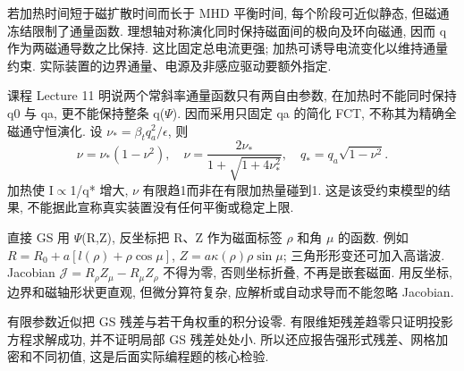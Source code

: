 \label{ch:fct}
若加热时间短于磁扩散时间而长于 MHD 平衡时间, 每个阶段可近似静态, 但磁通冻结限制了通量函数. 理想轴对称演化同时保持磁面间的极向及环向磁通, 因而 q 作为两磁通导数之比保持. 这比固定总电流更强; 加热可诱导电流变化以维持通量约束. 实际装置的边界通量、电源及非感应驱动要额外指定.

课程 Lecture 11 明说两个常斜率通量函数只有两自由参数, 在加热时不能同时保持 q0 与 qa, 更不能保持整条 q(\ensuremath{\Psi}). 因而采用只固定 qa 的简化 FCT, 不称其为精确全磁通守恒演化. 设 $\nu_*=\beta_tq_a^2/\epsilon$, 则
\begin{equation}
 \nu=\nu_*(1-\nu^2),\quad
 \nu=\frac{2\nu_*}{1+\sqrt{1+4\nu_*^2}},\quad
 q_*=q_a\sqrt{1-\nu^2}.
\end{equation}
加热使 I\ensuremath{\propto}1/q* 增大, \ensuremath{\nu} 有限趋1而非在有限加热量碰到1. 这是该受约束模型的结果, 不能据此宣称真实装置没有任何平衡或稳定上限.

直接 GS 用 \ensuremath{\Psi}(R,Z), 反坐标把 R、Z 作为磁面标签 \ensuremath{\rho} 和角 \ensuremath{\mu} 的函数. 例如 $R=R_0+a[l(\rho)+\rho\cos\mu]$, $Z=a\kappa(\rho)\rho\sin\mu$; 三角形形变还可加入高谐波. Jacobian $\mathcal J=R_\rho Z_\mu-R_\mu Z_\rho$ 不得为零, 否则坐标折叠, 不再是嵌套磁面. 用反坐标, 边界和磁轴形状更直观, 但微分算符复杂, 应解析或自动求导而不能忽略 Jacobian.

有限参数近似把 GS 残差与若干角权重的积分设零. 有限维矩残差趋零只证明投影方程求解成功, 并不证明局部 GS 残差处处小. 所以还应报告强形式残差、网格加密和不同初值, 这是后面实际编程题的核心检验.

